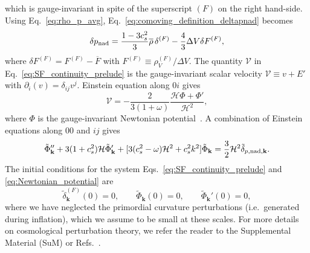 \documentclass[twocolumn,superscriptaddress,aps,preprintnumbers,amsmath,amssymb,prl,footinbib]{revtex4-2}
\begin{document}
which is gauge-invariant in spite of the superscript $(F)$ on the right hand-side. Using Eq.~\eqref{eq:rho_p_avg}, Eq.~\eqref{eq:comoving_definition_deltapnad} becomes
\begin{equation}
\label{eq:delta_nad_FOPT_main}
\delta p_{\rm nad} = \frac{1-3c_s^2}{3}\overline{\rho}\,\delta^{(F)}-\frac{4}{3}\Delta V\delta F^{(F)},
\end{equation}
where $\delta F^{(F)} = F^{(F)}-\overline{F}$ with $F^{(F)}\equiv \rho_V^{(F)}/\Delta V$.
The quantity $\mathcal{V}$ in Eq.~\eqref{eq:SF_continuity_prelude} is the gauge-invariant scalar velocity $\mathcal{V}\equiv v+E'$ with $\partial_i(v)=\delta_{ij}v^j$. Einstein equation along $0i$ gives
\begin{equation}
\label{eq:GI_velocity}
\mathcal{V}= -\frac{2}{3(1+\omega)} \frac{\mathcal{H}\Phi+\Phi'}{\mathcal{H}^2},
\end{equation}
where $\Phi$ is the gauge-invariant Newtonian potential~\cite{Bardeen:1980kt}. A combination of Einstein equations along $00$ and $ij$ gives
\begin{equation}
\label{eq:Newtonian_potential}
\tilde{\Phi}_{\mathbf{k}}'' + 3 (1 + c_s^2)\mathcal{H} \tilde{\Phi}_{\mathbf{k}}'
+[3 (c_s^2-\omega)\mathcal{H}^2+c_s^2 k^2]\tilde{\Phi}_{\mathbf{k}}
= \frac{3}{2}\mathcal{H}^2\tilde{\delta}_{p,\rm nad,\mathbf{k}}.
\end{equation}
The initial conditions for the system Eqs.~\eqref{eq:SF_continuity_prelude} and \eqref{eq:Newtonian_potential} are
\begin{equation}
\tilde{\delta}^{(F)}_{\mathbf{k}}(0)=0,\qquad \tilde{\Phi}_{\mathbf{k}}(0)=0,\qquad \tilde{\Phi}_{\mathbf{k}}'(0)=0,
\end{equation}
where we have neglected the primordial curvature perturbations (i.e.~generated during inflation), which we assume to be small at these scales.
For more details on cosmological perturbation theory, we refer the reader to the Supplemental Material (SuM) or Refs.~\cite{Kodama:1984ziu,Mukhanov:1990me,Mukhanov:2005sc,Baumann:2022mni,Peter:2013avv}.
\end{document}
